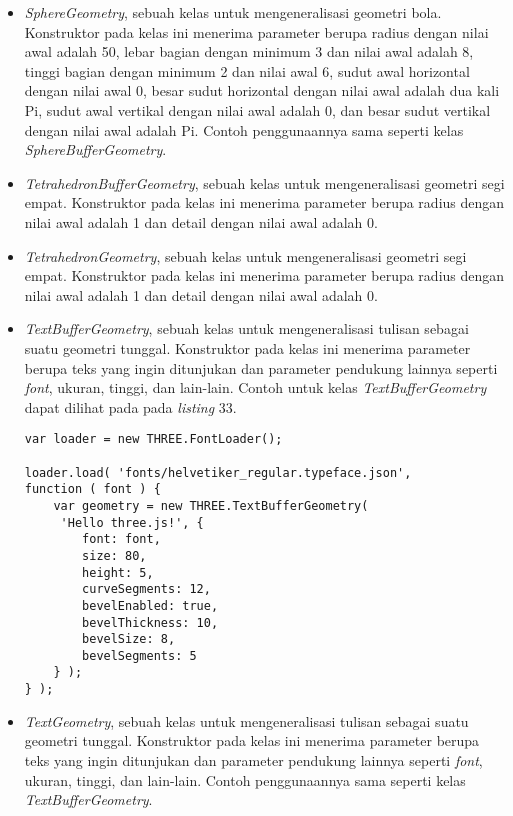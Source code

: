 \documentclass[a4paper,twoside]{article}
\begin{document}
\begin{enumerate}
\begin{itemize}
\begin{itemize}
	\item {\it SphereGeometry}, sebuah kelas untuk mengeneralisasi geometri bola. Konstruktor pada kelas ini menerima parameter berupa radius dengan nilai awal adalah 50, lebar bagian dengan minimum 3 dan nilai awal adalah 8, tinggi bagian dengan minimum 2 dan nilai awal 6, sudut awal horizontal dengan nilai awal 0, besar sudut horizontal dengan nilai awal adalah dua kali Pi, sudut awal vertikal dengan nilai awal adalah 0, dan besar sudut vertikal dengan nilai awal adalah Pi. Contoh penggunaannya sama seperti kelas {\it SphereBufferGeometry}.
	
	\item {\it TetrahedronBufferGeometry}, sebuah kelas untuk mengeneralisasi geometri segi empat. Konstruktor pada kelas ini menerima parameter berupa radius dengan nilai awal adalah 1 dan detail dengan nilai awal adalah 0.
	
	\item {\it TetrahedronGeometry}, sebuah kelas untuk mengeneralisasi geometri segi empat. Konstruktor pada kelas ini menerima parameter berupa radius dengan nilai awal adalah 1 dan detail dengan nilai awal adalah 0.
	
	\item {\it TextBufferGeometry}, sebuah kelas untuk mengeneralisasi tulisan sebagai suatu geometri tunggal. Konstruktor pada kelas ini menerima parameter berupa teks yang ingin ditunjukan dan parameter pendukung lainnya seperti {\it font}, ukuran, tinggi, dan lain-lain. Contoh untuk kelas {\it TextBufferGeometry} dapat dilihat pada pada {\it listing} 33.
	
\begin{lstlisting}[caption={Contoh penggunaan kelas {\it TextBufferGeometry}.},captionpos=b]
var loader = new THREE.FontLoader();

loader.load( 'fonts/helvetiker_regular.typeface.json',
function ( font ) {
	var geometry = new THREE.TextBufferGeometry(
	 'Hello three.js!', {
		font: font,
		size: 80,
		height: 5,
		curveSegments: 12,
		bevelEnabled: true,
		bevelThickness: 10,
		bevelSize: 8,
		bevelSegments: 5
	} );
} );
\end{lstlisting}

	\item {\it TextGeometry},  sebuah kelas untuk mengeneralisasi tulisan sebagai suatu geometri tunggal. Konstruktor pada kelas ini menerima parameter berupa teks yang ingin ditunjukan dan parameter pendukung lainnya seperti {\it font}, ukuran, tinggi, dan lain-lain. Contoh penggunaannya sama seperti kelas {\it TextBufferGeometry}.
	

\end{itemize}
\end{itemize}
\end{enumerate}
\end{document}
